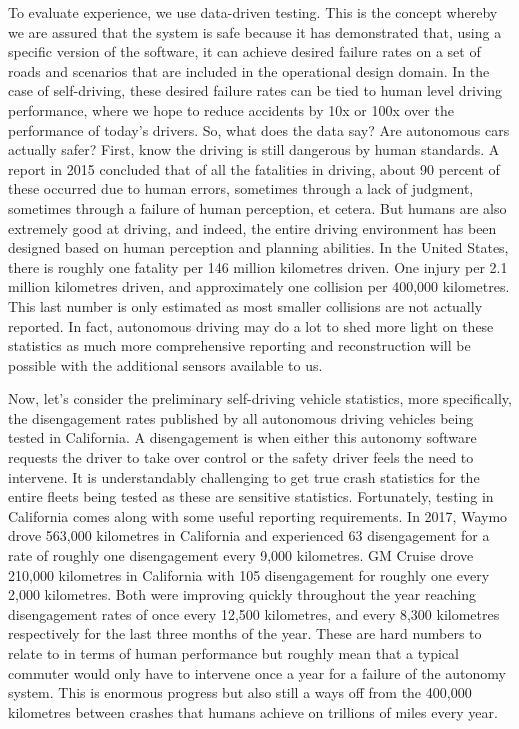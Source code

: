 To evaluate experience, we use data-driven testing. This is the concept whereby we are assured that the system is safe 
because it has demonstrated that, using a specific version of the software, it can achieve desired failure rates on a set of roads 
and scenarios that are included in the operational design domain. 
In the case of self-driving, these desired failure rates can be tied to human level driving performance, where 
we hope to reduce accidents by 10x or 100x over the performance of today's drivers. 
So, what does the data say? Are autonomous cars actually safer? First, know the driving is still dangerous by human standards. 
A report in 2015 concluded that of all the fatalities in driving, about 90 percent of 
these occurred due to human errors, sometimes through a lack of judgment, sometimes through a failure of human perception, et cetera. 
But humans are also extremely good at driving, and indeed, the entire driving environment has been designed based on human perception 
and planning abilities. In the United States, there is roughly one fatality per 146 million kilometres driven. 
One injury per 2.1 million kilometres driven, and approximately one collision per 400,000 kilometres. 
This last number is only estimated as most smaller collisions are not actually reported. In fact, autonomous driving may do a lot to 
shed more light on these statistics as much more comprehensive reporting and reconstruction will be possible with the additional sensors available to us. 

Now, let's consider the preliminary self-driving vehicle statistics, more specifically, 
the disengagement rates published by all autonomous driving vehicles being tested in California. 
A disengagement is when either this autonomy software requests the driver to take over 
control or the safety driver feels the need to intervene. It is understandably challenging to get true crash statistics for the 
entire fleets being tested as these are sensitive statistics. Fortunately, testing in California comes along with some useful 
reporting requirements. In 2017, Waymo drove 563,000 kilometres in California and experienced 63 disengagement for a rate of roughly one disengagement every 9,000 kilometres. 
GM Cruise drove 210,000 kilometres in California with 105 disengagement for roughly one every 2,000 kilometres. 
Both were improving quickly throughout the year reaching disengagement rates of once every 12,500 kilometres, and every 8,300 kilometres respectively for the last three months of the year. 
These are hard numbers to relate to in terms of human performance but roughly mean that a typical commuter would only have to 
intervene once a year for a failure of the autonomy system. This is enormous progress but also still a ways off from the 400,000 kilometres 
between crashes that humans achieve on trillions of miles every year. 

